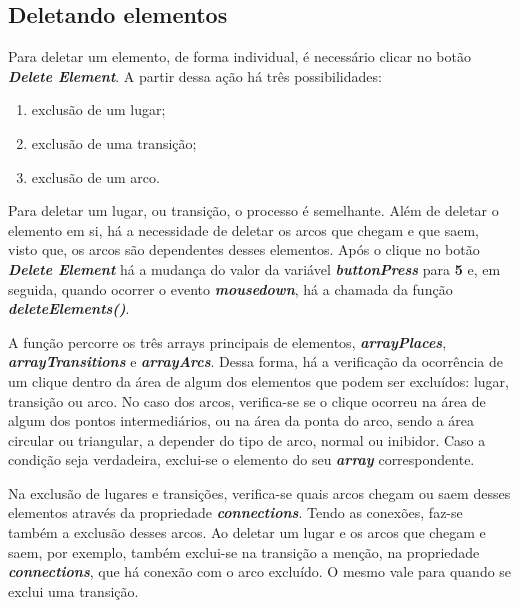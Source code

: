 \documentclass[
	12pt,				%
	openright,			%
	oneside,			%
	a4paper,			%
	english,			%
	brazil				%
	]{abntex2}
\theoremstyle{doispontos}
\begin{document}
\subsection{Deletando elementos}

Para deletar um elemento, de forma individual, é necessário clicar no botão \textbf{\textit{Delete Element}}. A partir dessa ação há três possibilidades: 

\begin{enumerate}
	\item exclusão de um lugar;
	\item exclusão de uma transição;
	\item exclusão de um arco.
\end{enumerate}

Para deletar um lugar, ou transição, o processo é semelhante. Além de deletar o elemento em si, há a necessidade de deletar os arcos que chegam e que saem, visto que, os arcos são dependentes desses elementos. Após o clique no botão \textbf{\textit{Delete Element}} há a mudança do valor da variável \textbf{\textit{buttonPress}} para \textbf{5} e, em seguida, quando ocorrer o evento \textbf{\textit{mousedown}}, há a chamada da função \textbf{\textit{deleteElements()}}. 

A função percorre os três arrays principais de elementos, \textbf{\textit{arrayPlaces}}, \textbf{\textit{arrayTransitions}} e \textbf{\textit{arrayArcs}}. Dessa forma, há a verificação da ocorrência de um clique dentro da área de algum dos elementos que podem ser excluídos: lugar, transição ou arco. No caso dos arcos, verifica-se se o clique ocorreu na área de algum dos pontos intermediários, ou na área da ponta do arco, sendo a área circular ou triangular, a depender do tipo de arco, normal ou inibidor. Caso a condição seja verdadeira, exclui-se o elemento do seu \textbf{\textit{array}} correspondente.



Na exclusão de lugares e transições, verifica-se quais arcos chegam ou saem desses elementos através da propriedade \textbf{\textit{connections}}. Tendo as conexões, faz-se também a exclusão desses arcos. Ao deletar um lugar e os arcos que chegam e saem, por exemplo, também exclui-se na transição a menção, na propriedade \textbf{\textit{connections}}, que há conexão com o arco excluído. O mesmo vale para quando se exclui uma transição. 
\end{document}
